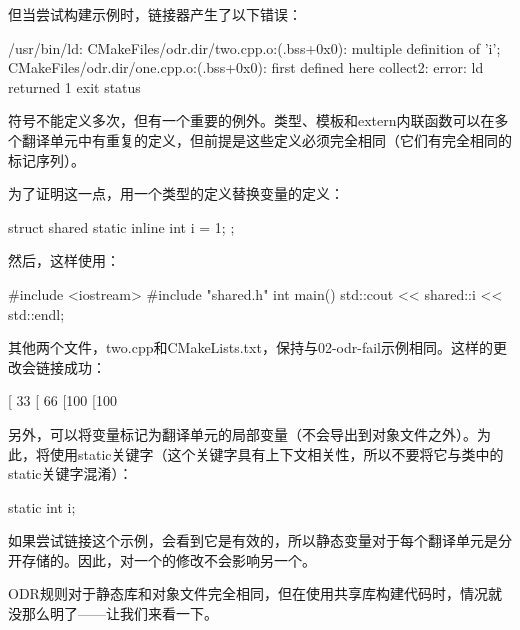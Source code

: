 但当尝试构建示例时，链接器产生了以下错误：

\begin{shell}
/usr/bin/ld:
CMakeFiles/odr.dir/two.cpp.o:(.bss+0x0): multiple definition of 'i';
CMakeFiles/odr.dir/one.cpp.o:(.bss+0x0): first defined here
collect2: error: ld returned 1 exit status
\end{shell}

符号不能定义多次，但有一个重要的例外。类型、模板和extern内联函数可以在多个翻译单元中有重复的定义，但前提是这些定义必须完全相同（它们有完全相同的标记序列）。

为了证明这一点，用一个类型的定义替换变量的定义：


\begin{cpp}
struct shared {
    static inline int i = 1;
};
\end{cpp}

然后，这样使用：


\begin{cpp}
#include <iostream>
#include "shared.h"
int main() {
    std::cout << shared::i << std::endl;
}
\end{cpp}

其他两个文件，two.cpp和CMakeLists.txt，保持与02-odr-fail示例相同。这样的更改会链接成功：

\begin{shell}
[ 33%
[ 66%
[100%
[100%
\end{shell}

另外，可以将变量标记为翻译单元的局部变量（不会导出到对象文件之外）。为此，将使用static关键字（这个关键字具有上下文相关性，所以不要将它与类中的static关键字混淆）：


\begin{cpp}
static int i;
\end{cpp}

如果尝试链接这个示例，会看到它是有效的，所以静态变量对于每个翻译单元是分开存储的。因此，对一个的修改不会影响另一个。

ODR规则对于静态库和对象文件完全相同，但在使用共享库构建代码时，情况就没那么明了——让我们来看一下。


